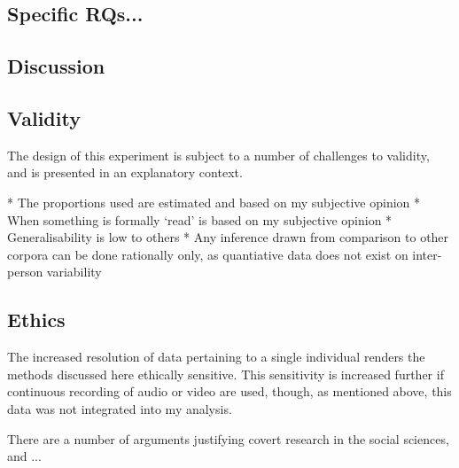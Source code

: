\subsection{Specific RQs...}





\subsection{Discussion}

\subsection{}



\subsection{Validity}
The design of this experiment is subject to a number of challenges to validity, and is presented in an explanatory context.

* The proportions used are estimated and based on my subjective opinion
* When something is formally `read' is based on my subjective opinion
* Generalisability is low to others
* Any inference drawn from comparison to other corpora can be done rationally only, as quantiative data does not exist on inter-person variability



\subsection{Ethics}
The increased resolution of data pertaining to a single individual renders the methods discussed here ethically sensitive.  This sensitivity is increased further if continuous recording of audio or video are used, though, as mentioned above, this data was not integrated into my analysis.

There are a number of arguments justifying covert research in the social sciences, and ...




